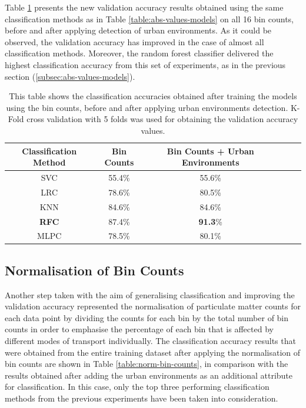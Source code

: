 \documentclass[bsc,frontabs,twoside,singlespacing, parskip,deptreport]{infthesis}     %
\begin{document}
Table \ref{table:urban-env-models} presents the new validation accuracy results obtained using the same classification methods as in Table \ref{table:abs-values-models} on all 16 bin counts, before and after applying detection of urban environments. As it could be observed, the validation accuracy has improved in the case of almost all classification methods. Moreover, the random forest classifier delivered the highest classification accuracy from this set of experiments, as in the previous section (\ref{subsec:abs-values-models}).

\begin{table}[h!]
\centering
 \begin{tabular}{||c | c | c | c | c | c||} 
 \hline
 Classification Method & Bin Counts & Bin Counts + Urban Environments \\ [0.5ex] 
 \hline\hline
 SVC & 55.4\% & 55.6\% \\ 
 \hline
 LRC & 78.6\% & 80.5\% \\
 \hline
 KNN & 84.6\% & 84.6\% \\ 
 \hline
 \textbf{RFC} & 87.4\% & \textbf{91.3}\% \\ 
 \hline
  MLPC & 78.5\% & 80.1\% \\ 
 \hline
\end{tabular}
\caption{This table shows the classification accuracies obtained after training the models using the bin counts, before and after applying urban environments detection. K-Fold cross validation with 5 folds was used for obtaining the validation accuracy values.}
\label{table:urban-env-models}
\end{table}


\subsection{Normalisation of Bin Counts}
\label{subsec:norm-bin-counts-results}

Another step taken with the aim of generalising classification and improving the validation accuracy represented the normalisation of particulate matter counts for each data point by dividing the counts for each bin by the total number of bin counts in order to emphasise the percentage of each bin that is affected by different modes of transport individually. The classification accuracy results that were obtained from the entire training dataset after applying the normalisation of bin counts are shown in Table \ref{table:norm-bin-counts}, in comparison with the results obtained after adding the urban environments as an additional attribute for classification. In this case, only the top three performing classification methods from the previous experiments have been taken into consideration.
\end{document}
